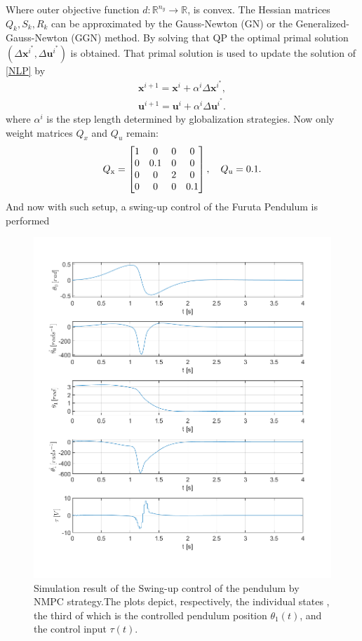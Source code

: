 Where outer objective function $d:\mathbb{R}^{n_y}\rightarrow \mathbb{R}$, is convex. The Hessian matrices $Q_k,S_k,R_k$ can be approximated by the Gauss-Newton (GN) or the Generalized-Gauss-Newton (GGN) method. By solving that QP the optimal primal solution $(\Delta \mathbf{x}^{i^*}, \Delta \mathbf{u}^{i^*})$ is obtained. That primal solution is used to update the solution of \eqref{NLP} by
\begin{subequations}
	\begin{align}
	\mathbf{x}^{i+1} = \mathbf{x}^{i} + \alpha^i \Delta\mathbf{x}^{i^*}, \\ \mathbf{u}^{i+1} = \mathbf{u}^{i} + \alpha^i \Delta\mathbf{u}^{i^*}.
	\end{align}
\end{subequations}
where $\alpha^i$ is the step length determined by globalization strategies. 
Now only weight matrices $Q_x$ and $Q_u$ remain:
\begin{equation}
	Q _{\text{x}} = \begin{bmatrix}
	1&0&0&0\\
	0&0.1&0&0\\
	0&0&2&0\\
	0&0&0&0.1
	\end{bmatrix}, \quad Q _{\text{u}} = 0.1.
\end{equation}
And now with such setup, a swing-up control of the Furuta Pendulum is performed
\newpage
\begin{figure}[H]
	\centering
	\includegraphics[width=1.1\linewidth]{images/NMPC}
	\caption{Simulation result of the Swing-up control of the pendulum by NMPC strategy.The plots depict, respectively, the individual states , the third of which is the controlled pendulum position $\theta_1(t)$, and the control input $\tau(t)$.}
	\label{NMPC}
\end{figure}